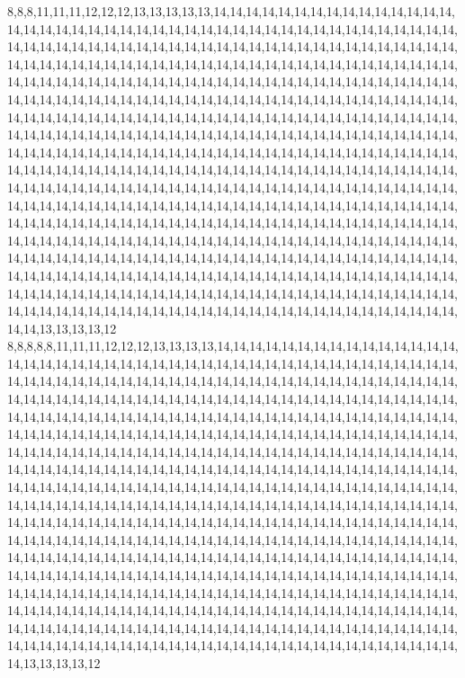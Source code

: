 8,8,8,11,11,11,12,12,12,13,13,13,13,13,14,14,14,14,14,14,14,14,14,14,14,14,14,14,14,14,14,14,14,14,14,14,14,14,14,14,14,14,14,14,14,14,14,14,14,14,14,14,14,14,14,14,14,14,14,14,14,14,14,14,14,14,14,14,14,14,14,14,14,14,14,14,14,14,14,14,14,14,14,14,14,14,14,14,14,14,14,14,14,14,14,14,14,14,14,14,14,14,14,14,14,14,14,14,14,14,14,14,14,14,14,14,14,14,14,14,14,14,14,14,14,14,14,14,14,14,14,14,14,14,14,14,14,14,14,14,14,14,14,14,14,14,14,14,14,14,14,14,14,14,14,14,14,14,14,14,14,14,14,14,14,14,14,14,14,14,14,14,14,14,14,14,14,14,14,14,14,14,14,14,14,14,14,14,14,14,14,14,14,14,14,14,14,14,14,14,14,14,14,14,14,14,14,14,14,14,14,14,14,14,14,14,14,14,14,14,14,14,14,14,14,14,14,14,14,14,14,14,14,14,14,14,14,14,14,14,14,14,14,14,14,14,14,14,14,14,14,14,14,14,14,14,14,14,14,14,14,14,14,14,14,14,14,14,14,14,14,14,14,14,14,14,14,14,14,14,14,14,14,14,14,14,14,14,14,14,14,14,14,14,14,14,14,14,14,14,14,14,14,14,14,14,14,14,14,14,14,14,14,14,14,14,14,14,14,14,14,14,14,14,14,14,14,14,14,14,14,14,14,14,14,14,14,14,14,14,14,14,14,14,14,14,14,14,14,14,14,14,14,14,14,14,14,14,14,14,14,14,14,14,14,14,14,14,14,14,14,14,14,14,14,14,14,14,14,14,14,14,14,14,14,14,14,14,14,14,14,14,14,14,14,14,14,14,14,14,14,14,14,14,14,14,14,14,14,14,14,14,14,14,14,14,14,14,14,14,14,14,14,14,14,14,14,14,14,14,14,14,14,14,14,14,14,14,14,14,14,14,14,14,14,14,14,14,14,14,14,14,14,14,14,14,14,14,14,14,14,14,14,14,14,14,14,14,14,14,14,14,14,14,14,14,14,14,14,14,14,14,14,14,14,14,14,14,14,14,14,14,14,14,14,14,14,14,14,14,14,14,14,14,14,14,14,13,13,13,13,12
8,8,8,8,8,11,11,11,12,12,12,13,13,13,13,14,14,14,14,14,14,14,14,14,14,14,14,14,14,14,14,14,14,14,14,14,14,14,14,14,14,14,14,14,14,14,14,14,14,14,14,14,14,14,14,14,14,14,14,14,14,14,14,14,14,14,14,14,14,14,14,14,14,14,14,14,14,14,14,14,14,14,14,14,14,14,14,14,14,14,14,14,14,14,14,14,14,14,14,14,14,14,14,14,14,14,14,14,14,14,14,14,14,14,14,14,14,14,14,14,14,14,14,14,14,14,14,14,14,14,14,14,14,14,14,14,14,14,14,14,14,14,14,14,14,14,14,14,14,14,14,14,14,14,14,14,14,14,14,14,14,14,14,14,14,14,14,14,14,14,14,14,14,14,14,14,14,14,14,14,14,14,14,14,14,14,14,14,14,14,14,14,14,14,14,14,14,14,14,14,14,14,14,14,14,14,14,14,14,14,14,14,14,14,14,14,14,14,14,14,14,14,14,14,14,14,14,14,14,14,14,14,14,14,14,14,14,14,14,14,14,14,14,14,14,14,14,14,14,14,14,14,14,14,14,14,14,14,14,14,14,14,14,14,14,14,14,14,14,14,14,14,14,14,14,14,14,14,14,14,14,14,14,14,14,14,14,14,14,14,14,14,14,14,14,14,14,14,14,14,14,14,14,14,14,14,14,14,14,14,14,14,14,14,14,14,14,14,14,14,14,14,14,14,14,14,14,14,14,14,14,14,14,14,14,14,14,14,14,14,14,14,14,14,14,14,14,14,14,14,14,14,14,14,14,14,14,14,14,14,14,14,14,14,14,14,14,14,14,14,14,14,14,14,14,14,14,14,14,14,14,14,14,14,14,14,14,14,14,14,14,14,14,14,14,14,14,14,14,14,14,14,14,14,14,14,14,14,14,14,14,14,14,14,14,14,14,14,14,14,14,14,14,14,14,14,14,14,14,14,14,14,14,14,14,14,14,14,14,14,14,14,14,14,14,14,14,14,14,14,14,14,14,14,14,14,14,14,14,14,14,14,14,14,14,14,14,14,14,14,14,14,14,14,14,14,14,14,14,14,14,14,14,14,14,14,14,14,14,14,14,14,14,14,14,14,14,14,14,14,14,14,14,14,14,14,14,13,13,13,13,12
